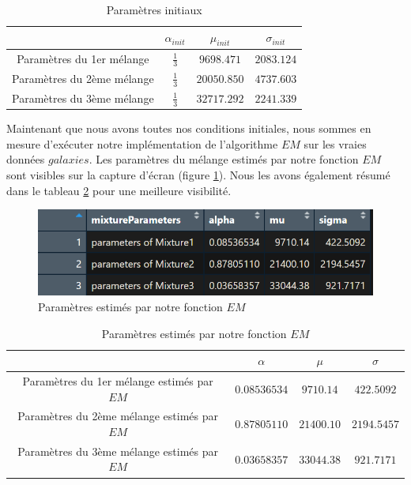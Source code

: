 \documentclass[a4paper,french,10pt]{article}
\begin{document}
\begin{table}[htp]
	\center
	\begin{tabular}{|c||c|c|c|}
		\hline
		& $\alpha_{init}$ & $\mu_{init}$ & $\sigma_{init}$\\
		\hline
		Paramètres du 1er mélange & $\frac{1}{3}$ & $9698.471$ & $2083.124$ \\
		\hline
		Paramètres du 2ème mélange & $\frac{1}{3}$ & $20050.850$ & $4737.603$ \\
		\hline
		Paramètres du 3ème mélange & $\frac{1}{3}$ & $32717.292$ & $2241.339$ \\
		\hline
	\end{tabular}
	\caption{Paramètres initiaux}
	\label{tab5}
\end{table}

Maintenant que nous avons toutes nos conditions initiales, nous sommes en mesure d'exécuter notre implémentation de l'algorithme $EM$ sur les vraies données $galaxies$. Les paramètres du mélange estimés par notre fonction $EM$ sont visibles sur la capture d'écran (figure \ref{res_EM}). Nous les avons également résumé dans le tableau \ref{tab6} pour une meilleure visibilité. 

\begin{figure}[htp] 
	\centering
	\includegraphics[scale=0.8]{images/paramEstEM.png}
	\caption{Paramètres estimés par notre fonction $EM$}
	\label{res_EM}
\end{figure}

\begin{table}[htp]
	\center
	\begin{tabular}{|c||c|c|c|}
		\hline
		& $\alpha$ & $\mu$ & $\sigma$\\
		\hline
		Paramètres du 1er mélange estimés par $EM$ & $0.08536534$ & $9710.14$ & $422.5092$ \\
		\hline
		Paramètres du 2ème mélange estimés par $EM$ & $0.87805110$ & $21400.10$ & $2194.5457$ \\
		\hline
		Paramètres du 3ème mélange estimés par $EM$ & $0.03658357$ & $33044.38$ & $921.7171$ \\
		\hline
	\end{tabular}
	\caption{Paramètres estimés par notre fonction $EM$}
	\label{tab6}
\end{table}
\end{document}
